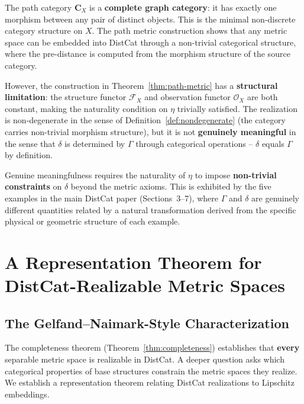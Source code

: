 \documentclass[11pt,a4paper]{article}
\begin{document}
\begin{remark}
The path category $\mathbf{C}_X$ is a \textbf{complete graph category}: it
has exactly one morphism between any pair of distinct objects. This is the
minimal non-discrete category structure on $X$. The path metric construction
shows that any metric space can be embedded into DistCat through a
non-trivial categorical structure, where the pre-distance is computed from
the morphism structure of the source category.

However, the construction in Theorem~\ref{thm:path-metric} has a
\textbf{structural limitation}: the structure functor $\mathcal{F}_X$ and
observation functor $\mathcal{O}_X$ are both constant, making the naturality
condition on $\eta$ trivially satisfied. The realization is non-degenerate
in the sense of Definition~\ref{def:nondegenerate} (the category carries
non-trivial morphism structure), but it is not \textbf{genuinely meaningful}
in the sense that $\delta$ is determined by $\Gamma$ through categorical
operations -- $\delta$ equals $\Gamma$ by definition.

Genuine meaningfulness requires the naturality of $\eta$ to impose
\textbf{non-trivial constraints} on $\delta$ beyond the metric axioms.
This is exhibited by the five examples in the main DistCat paper (Sections~3--7),
where $\Gamma$ and $\delta$ are genuinely different quantities related by a
natural transformation derived from the specific physical or geometric
structure of each example.
\end{remark}

\section{A Representation Theorem for DistCat-Realizable Metric Spaces}

\subsection{The Gelfand--Naimark-Style Characterization}

The completeness theorem (Theorem~\ref{thm:completeness}) establishes that
\textbf{every} separable metric space is realizable in DistCat. A deeper
question asks which categorical properties of base structures constrain the
metric spaces they realize. We establish a representation theorem relating
DistCat realizations to Lipschitz embeddings.
\end{document}
